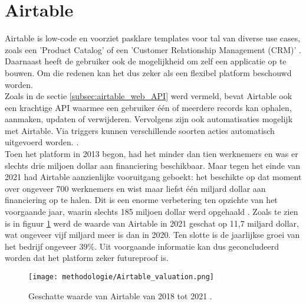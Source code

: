 \section{Airtable} 

Airtable is low-code en voorziet pasklare templates voor tal van diverse use cases, zoals een 'Product Catalog' of een 'Customer Relationship Management (CRM)' \autocite{Maout2022}. Daarnaast heeft de gebruiker ook de mogelijkheid om zelf een applicatie op te bouwen. Om die redenen kan het dus zeker als een flexibel platform beschouwd worden. \\

Zoals in de sectie \ref{subsec:airtable_web_API} werd vermeld, bevat Airtable ook een krachtige API waarmee een gebruiker één of meerdere records kan ophalen, aanmaken, updaten of verwijderen. Vervolgens zijn ook automatisaties mogelijk met Airtable. Via triggers kunnen verschillende soorten acties automatisch uitgevoerd worden. \autocite{AirtableAutomations2023}. \\

Toen het platform in 2013 begon, had het minder dan tien werknemers en was er slechts drie miljoen dollar aan financiering beschikbaar. Maar tegen het einde van 2021 had Airtable aanzienlijke vooruitgang geboekt: het beschikte op dat moment over ongeveer 700 werknemers en wist maar liefst één miljard dollar aan financiering op te halen. Dit is een enorme verbetering ten opzichte van het voorgaande jaar, waarin slechts 185 miljoen dollar werd opgehaald \autocite{Khemchandani2023}. Zoals te zien is in figuur \ref{fig:airtable_value} werd de waarde van Airtable in 2021 geschat op 11,7 miljard dollar, wat ongeveer vijf miljard meer is dan in 2020. Ten slotte is de jaarlijkse groei van het bedrijf ongeveer 39\%. Uit voorgaande informatie kan dus geconcludeerd worden dat het platform zeker futureproof is. \\

\begin{figure}[h]
    \centering
    \texttt{[image: methodologie/Airtable\_valuation.png]}
    \caption[Geschatte waarde van Airtable]{Geschatte waarde van Airtable van 2018 tot 2021 \autocite{Khemchandani2023}.}
    \label{fig:airtable_value}
\end{figure}

